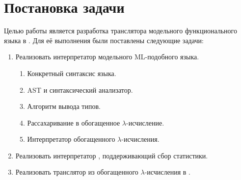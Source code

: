 
\section{Постановка задачи}
\label{sec:task}

Целью работы является разработка транслятора модельного функционального языка в \INs{}.
Для её выполнения были поставлены следующие задачи:

\begin{enumerate}
    \item Реализовать интерпретатор модельного ML-подобного языка.
          \begin{enumerate}
              \item Конкретный синтаксис языка.
              \item AST и синтаксический анализатор.
              \item Алгоритм вывода типов.
              \item Рассахаривание в обогащенное $\lambda$-исчисление.
              \item Интерпретатор обогащенного $\lambda$-исчисления.
          \end{enumerate}
    \item Реализовать интерпретатор \INs{}, поддерживающий сбор статистики.
    \item Реализовать транслятор из обогащенного $\lambda$-исчисления в \INs{}.
\end{enumerate}

